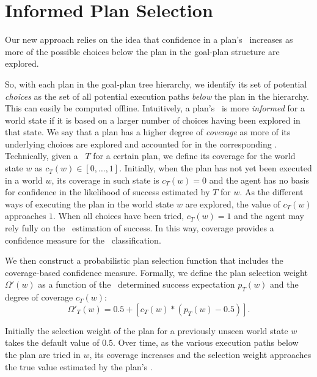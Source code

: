 \section{Informed Plan Selection}\label{sec:coverage}

Our new approach relies on the idea that confidence in a plan's
\dt\ increases as more of the possible choices below the plan
in the goal-plan structure are explored.

So, with each plan in the goal-plan tree hierarchy, we identify its set of
potential \textit{choices} as the set of all potential execution paths
\textit{below} the plan in the hierarchy. This can easily be computed offline.
Intuitively, a plan's \dt\ is more \textit{informed} for a world state if it is
based on a larger number of choices having been explored in that state. We say
that a plan has a higher degree of \emph{coverage} as more of its underlying
choices are explored and accounted for in the corresponding \dt. Technically,
given a \dt\ $T$ for a certain plan, we define its coverage for the world state
$w$ as $c_T(w) \in [0,\ldots,1]$.
Initially, when the plan has not yet been executed in a world $w$, its coverage
in such state is $c_T(w) = 0$ and the agent has no basis for confidence in the
likelihood of success estimated by $T$ for $w$.
As the different ways of executing the plan in the world state $w$ are explored,
the value of $c_T(w)$ approaches $1$. When all choices have been tried,
$c_T(w)=1$ and the agent may rely fully on the \dt\ estimation of success.
In this way, coverage provides a confidence measure for the \dt\ classification.


We then construct a probabilistic plan selection function that includes the
coverage-based confidence measure.
Formally, we define the plan selection weight $\Omega'(w)$ as a function of the
\dt\ determined success expectation $p_T(w)$ and the degree of coverage $c_T(w)$:
\begin{equation*}\label{eqn:coverage}   
\Omega'_T(w) = 0.5 + \left[  c_T(w) *  \left( p_T(w) - 0.5 \right)  \right].
\end{equation*}
	
	
Initially the selection weight of the plan for a previously unseen world state $w$ takes the default value of $0.5$.
Over time, as the various execution paths below the plan are tried in $w$, its coverage increases 
and the selection weight approaches the true value estimated by the plan's \dt.


